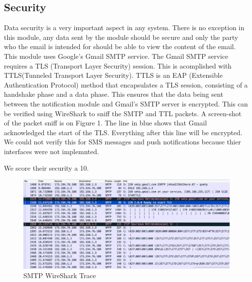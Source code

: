 \documentclass[11pt]{article}
\begin{document}
    \subsection{Security}
    Data security is a very important aspect in any system. There is no exception in this module, any data sent by the module should be secure and only the party who the email is intended for should be able to view the content of the email. This module uses Google's Gmail SMTP service. The Gmail SMTP service requires a TLS (Transport Layer Security) session. This is acomplished with TTLS(Tunneled Transport Layer Security). TTLS is an EAP (Extensible Authentication Protocol) method that encapsulates a TLS session, consisting of a handshake phase and a data phase. This ensures that the data being sent between the notification module and Gmail's SMTP server is encrypted. This can be verified using WireShark to sniff the SMTP and TTL packets. A screen-shot of the packet sniff is on Figure 1. The line in blue shows that Gmail acknowledged the start of the TLS. Everything after this line will be encrypted. We could not verify this for SMS messages and push notifications because thier interfaces were not implemnted.
    
    We score their security a 10.
    
    \begin{figure}[h!]
      \caption{SMTP WireShark Trace}
      \includegraphics[width=\textwidth]{smtp.jpeg}
    \end{figure}
        
    \newpage
        
\end{document}
